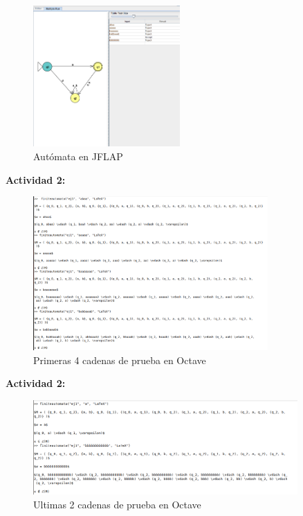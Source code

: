 \documentclass[titlepage,12pt]{article}
\begin{document}
\begin{figure}[H]
    \centering
    \includegraphics[width=0.5\textwidth]{AutomataEnJFLAP.png}
    \caption{Autómata en JFLAP}
    \label{fig:fig1}
\end{figure}

\textbf{Actividad 2:}
\begin{figure}[h]
    \centering
    \includegraphics[width=0.8\textwidth]{AutomataenOctave1.png}
    \caption{Primeras 4 cadenas de prueba en Octave}
    \label{fig:fig2}
\end{figure}

\newpage

\textbf{Actividad 2:}
\begin{figure}[h]
    \centering
    \includegraphics[width=0.9\textwidth]{AutomataenOctave2.png}
    \caption{Ultimas 2 cadenas de prueba en Octave}
    \label{fig:fig3}
\end{figure}
\end{document}

